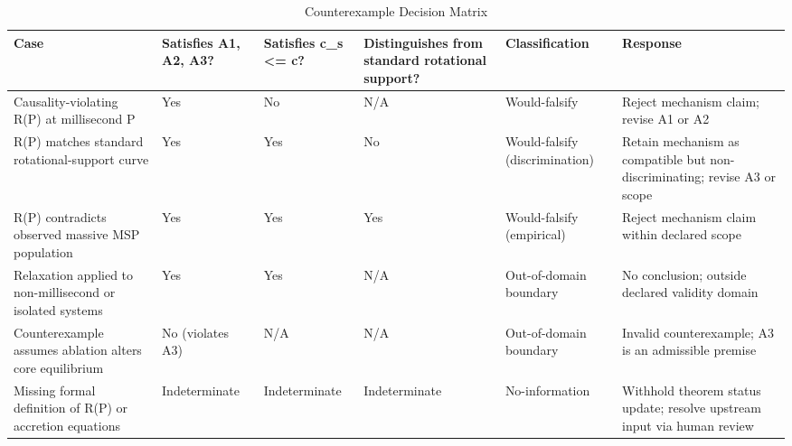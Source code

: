\documentclass[conference]{IEEEtran}
\begin{document}
\begin{table}[htbp]
\centering
\footnotesize
\setlength{\tabcolsep}{3pt}
\renewcommand{\arraystretch}{1.12}
\caption{Counterexample Decision Matrix}
\label{tab:forward-derivation-and-counterexamples-fd-06}
\begin{tabular}{|p{}|p{}|p{}|p{}|p{}|p{}|}
\hline
Case & Satisfies A1, A2, A3? & Satisfies c\_s <= c? & Distinguishes from standard rotational support? & Classification & Response \\\hline
Causality-violating R(P) at millisecond P & Yes & No & N/A & Would-falsify & Reject mechanism claim; revise A1 or A2 \\\hline
R(P) matches standard rotational-support curve & Yes & Yes & No & Would-falsify (discrimination) & Retain mechanism as compatible but non-discriminating; revise A3 or scope \\\hline
R(P) contradicts observed massive MSP population & Yes & Yes & Yes & Would-falsify (empirical) & Reject mechanism claim within declared scope \\\hline
Relaxation applied to non-millisecond or isolated systems & Yes & Yes & N/A & Out-of-domain boundary & No conclusion; outside declared validity domain \\\hline
Counterexample assumes ablation alters core equilibrium & No (violates A3) & N/A & N/A & Out-of-domain boundary & Invalid counterexample; A3 is an admissible premise \\\hline
Missing formal definition of R(P) or accretion equations & Indeterminate & Indeterminate & Indeterminate & No-information & Withhold theorem status update; resolve upstream input via human review \\\hline
\end{tabular}
\end{table}
\end{document}
